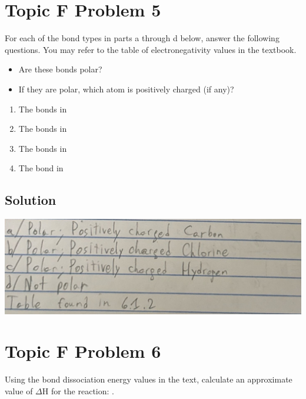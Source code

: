 \documentclass[10pt]{article}
\begin{document}
    \section{Topic F Problem 5}
        For each of the bond types in parts a through d below, answer the following questions. 
        You may refer to the table of electronegativity values in the textbook.
        \begin{itemize}
            \item   Are these bonds polar?
            \item   If they are polar, which atom is positively charged (if any)?
        \end{itemize}
        \begin{multicols}{2}
            \begin{enumerate}[label=\alph*)]
                \item   The  bonds in 
                \item   The  bonds in 
                \item   The  bonds in  
                \item   The  bond in 
            \end{enumerate}
        \end{multicols}
        
        \subsection{Solution}
            \begin{center}
                \includegraphics[width=\textwidth]{Answers Images/F5.jpg}
            \end{center}


    \pagebreak
    \section{Topic F Problem 6}
        Using the bond dissociation energy values in the text, calculate an approximate value of $\Delta$H for the reaction: .
        
\end{document}
